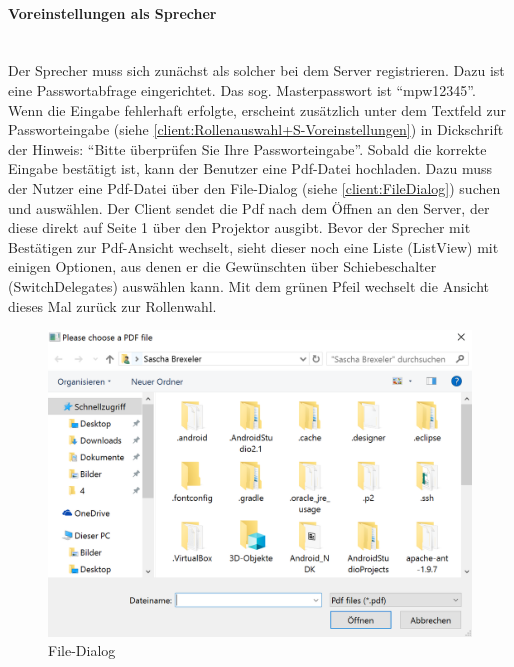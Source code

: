 \paragraph{Voreinstellungen als Sprecher}$\;$\\
Der Sprecher muss sich zunächst als solcher bei dem Server registrieren. Dazu ist eine Passwortabfrage eingerichtet. Das sog. Masterpasswort ist "`mpw12345"'. Wenn die Eingabe fehlerhaft erfolgte, erscheint zusätzlich unter dem Textfeld zur Passworteingabe (siehe \autoref{client:Rollenauswahl+S-Voreinstellungen}) in Dickschrift der Hinweis: "`Bitte überprüfen Sie Ihre Passworteingabe"'. Sobald die korrekte Eingabe bestätigt ist, kann der Benutzer eine Pdf-Datei hochladen. Dazu muss der Nutzer eine Pdf-Datei über den File-Dialog (siehe \autoref{client:FileDialog}) suchen und auswählen. Der Client sendet die Pdf nach dem Öffnen an den Server, der diese direkt auf Seite 1 über den Projektor ausgibt. Bevor der Sprecher mit Bestätigen zur Pdf-Ansicht wechselt, sieht dieser noch eine Liste (ListView) mit einigen Optionen, aus denen er die Gewünschten über Schiebeschalter (SwitchDelegates) auswählen kann. Mit dem grünen Pfeil wechselt die Ansicht dieses Mal zurück zur Rollenwahl.

\begin{figure}[ht!]
	\centering
	\includegraphics[scale=0.7]{GUI/Bilder/3-S-4-Voreinstellung.PNG}
	\caption{File-Dialog{\tiny}}
	\label{client:FileDialog}
\end{figure}

\newpage

